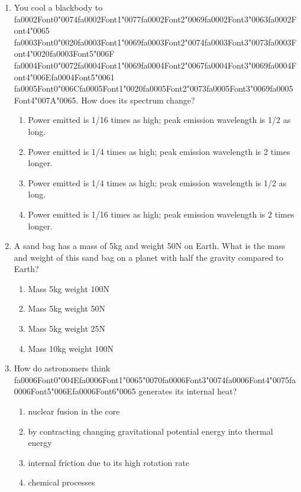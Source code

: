 \documentclass[12pt]{article}
\begin{document}
\begin{enumerate}[label=\arabic*.]
\item You cool a blackbody to {\csname fa0002Font0\endcsname\char"0074}{\csname fa0002Font1\endcsname\char"0077}{\csname fa0002Font2\endcsname\char"0069}{\csname fa0002Font3\endcsname\char"0063}{\csname fa0002Font4\endcsname\char"0065} {\csname fa0003Font0\endcsname\char"0020}{\csname fa0003Font1\endcsname\char"0069}{\csname fa0003Font2\endcsname\char"0074}{\csname fa0003Font3\endcsname\char"0073}{\csname fa0003Font4\endcsname\char"0020}{\csname fa0003Font5\endcsname\char"006F} {\csname fa0004Font0\endcsname\char"0072}{\csname fa0004Font1\endcsname\char"0069}{\csname fa0004Font2\endcsname\char"0067}{\csname fa0004Font3\endcsname\char"0069}{\csname fa0004Font4\endcsname\char"006E}{\csname fa0004Font5\endcsname\char"0061} {\csname fa0005Font0\endcsname\char"006C}{\csname fa0005Font1\endcsname\char"0020}{\csname fa0005Font2\endcsname\char"0073}{\csname fa0005Font3\endcsname\char"0069}{\csname fa0005Font4\endcsname\char"007A}{\char"0065}. How does its spectrum change?
\begin{enumerate}[label=(\alph*)]
    \item Power emitted is 1/16 times as high; peak emission wavelength is 1/2 as long.
    \item Power emitted is 1/4 times as high; peak emission wavelength is 2 times longer.
    \item Power emitted is 1/4 times as high; peak emission wavelength is 1/2 as long.
    \item Power emitted is 1/16 times as high; peak emission wavelength is 2 times longer.
\end{enumerate}
\item A sand bag has a mass of 5kg and weight 50N on Earth. What is the mass and weight of this
sand bag on a planet with half the gravity compared to Earth?
\begin{enumerate}[label=(\alph*)]
    \item Mass 5kg weight 100N
    \item Mass 5kg weight 50N
    \item Mass 5kg weight 25N
    \item Mass 10kg weight 100N
\end{enumerate}
\item How do astronomers think {\csname fa0006Font0\endcsname\char"004E}{\csname fa0006Font1\endcsname\char"0065}{\char"0070}{\csname fa0006Font3\endcsname\char"0074}{\csname fa0006Font4\endcsname\char"0075}{\csname fa0006Font5\endcsname\char"006E}{\csname fa0006Font6\endcsname\char"0065} generates its internal heat?
\begin{enumerate}[label=(\alph*)]
    \item nuclear fusion in the core
    \item by contracting changing gravitational potential energy into thermal energy
    \item internal friction due to its high rotation rate
    \item chemical processes
\end{enumerate}
\end{enumerate}
\end{document}
